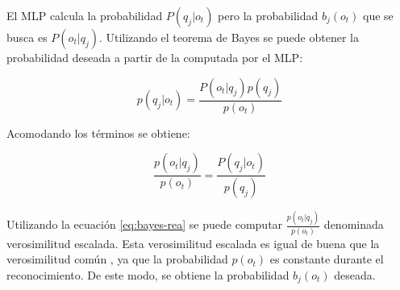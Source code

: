 El \gls{MLP} calcula la probabilidad $P(q_j|o_t)$ pero la probabilidad $b_j(o_t)$ que se busca es $P(o_t|q_j)$. Utilizando el teorema de
Bayes se puede obtener la probabilidad deseada a partir de la computada por el \gls{MLP}:

\begin{equation}
    p(q_j|o_t) = \frac{P(o_t|q_j)p(q_j)}{p(o_t)}
\end{equation}

Acomodando los t\'erminos se obtiene:

\begin{equation}
    \frac{p(o_t|q_j)}{p(o_t)} = \frac{P(q_j|o_t)}{p(q_j)}
\label{eq:bayes-rea}
\end{equation}

Utilizando la ecuaci\'on \eqref{eq:bayes-rea} se puede computar $\frac{p(o_t|q_j)}{p(o_t)}$ denominada verosimilitud escalada. Esta
verosimilitud escalada es igual de buena que la verosimilitud com\'un \cite{Jurafsky}, ya que la probabilidad $p(o_t)$ es constante
durante el reconocimiento. De este modo, se obtiene la probabilidad $b_j(o_t)$ deseada.

